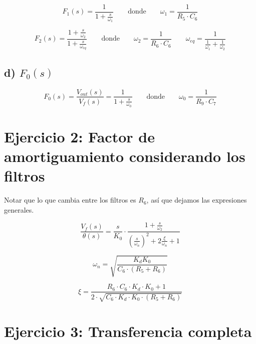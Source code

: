 \documentclass{article}
\begin{document}
\begin{equation} \label{f1_eqn}
F_1(s) = \frac{1}{ 1 + \frac{s}{\omega_1}
}
\qquad \text{donde} \qquad \omega_1=\frac{1}{R_5\cdot C_6} 
\end{equation}


\begin{equation} \label{f2_eqn}
F_2(s) = \frac{1+\frac{s}{\omega_2}}{ 1 + \frac{s}{\omega_{eq}}} \qquad \text{donde} \qquad \omega_2=\frac{1}{R_6\cdot C_6} \qquad \omega_{eq} = \frac{1}{\frac{1}{\omega_1} + \frac{1}{\omega_2}} 
\end{equation}


\subsection*{d) $F_0(s)$}

\begin{equation} \label{fo_eqn}
F_0(s) = \frac{V_{out}(s)}{V_f(s)} = \frac{1}{ 1 + \frac{s}{\omega_0}} \qquad \text{donde} \qquad \omega_0=\frac{1}{R_9\cdot C_7}
\end{equation}

\newpage

\section*{Ejercicio 2: Factor de amortiguamiento considerando los filtros}

Notar que lo que cambia entre los filtros es $R_6$, así que dejamos las expresiones generales.

\begin{equation} \label{vftheta_eqn}
\frac{V_f(s)}{\theta(s)} = \frac{ s}{K_0}
\cdot \frac{ 1 + \frac{s}{\omega_2} }
{ \left(\frac{s}{\omega_n}\right)^2 + 2\frac{\xi}{\omega_n}  + 1}
\end{equation}

\begin{equation} \label{wn_eqn}
\omega_n = \sqrt{\frac{K_d K_0}{C_6\cdot(R_5+R_6)}}
\end{equation}


\begin{equation} \label{xi_eqn}
\xi = \frac{R_6 \cdot C_6\cdot K_d\cdot K_0  + 1}
{2\cdot \sqrt{C_6 \cdot K_d \cdot K_0 \cdot(R_5 + R_6)}}
\end{equation}

\section*{Ejercicio 3: Transferencia completa}
\end{document}
